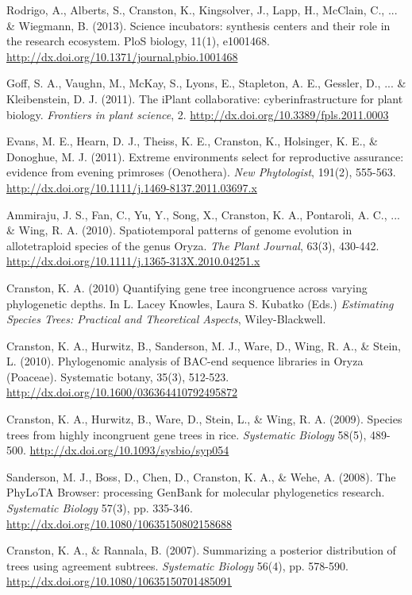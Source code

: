 \documentclass[10pt]{article}
\begin{document}
Rodrigo, A., Alberts, S., Cranston, K., Kingsolver, J., Lapp, H., McClain, C., ... \& Wiegmann, B. (2013). Science incubators: synthesis centers and their role in the research ecosystem. PloS biology, 11(1), e1001468. \url{http://dx.doi.org/10.1371/journal.pbio.1001468} 

Goff, S. A., Vaughn, M., McKay, S., Lyons, E., Stapleton, A. E., Gessler, D., ... \& Kleibenstein, D. J. (2011). The iPlant collaborative: cyberinfrastructure for plant biology. \textit{Frontiers in plant science}, 2. \url{http://dx.doi.org/10.3389/fpls.2011.0003} 

Evans, M. E., Hearn, D. J., Theiss, K. E., Cranston, K., Holsinger, K. E., \& Donoghue, M. J. (2011). Extreme environments select for reproductive assurance: evidence from evening primroses (Oenothera). \textit{New Phytologist}, 191(2), 555-563. \url{http://dx.doi.org/10.1111/j.1469-8137.2011.03697.x} 

Ammiraju, J. S., Fan, C., Yu, Y., Song, X., Cranston, K. A., Pontaroli, A. C., ... \& Wing, R. A. (2010). Spatiotemporal patterns of genome evolution in allotetraploid species of the genus Oryza. \textit{The Plant Journal}, 63(3), 430-442. \url{http://dx.doi.org/10.1111/j.1365-313X.2010.04251.x} 

Cranston, K. A. (2010) Quantifying gene tree incongruence across varying phylogenetic depths. In L. Lacey Knowles, Laura S. Kubatko (Eds.) \textit{Estimating Species Trees: Practical and Theoretical Aspects}, Wiley-Blackwell.

Cranston, K. A., Hurwitz, B., Sanderson, M. J., Ware, D., Wing, R. A., \& Stein, L. (2010). Phylogenomic analysis of BAC-end sequence libraries in Oryza (Poaceae). Systematic botany, 35(3), 512-523. \url{http://dx.doi.org/10.1600/036364410792495872} 

Cranston, K. A., Hurwitz, B., Ware, D., Stein, L., \& Wing, R. A. (2009). Species trees from highly incongruent gene trees in rice.  \textit{Systematic Biology} 58(5), 489-500. \url{http://dx.doi.org/10.1093/sysbio/syp054} 

Sanderson, M. J., Boss, D., Chen, D., Cranston, K. A., \& Wehe, A. (2008). The PhyLoTA Browser: processing GenBank for molecular phylogenetics research. \textit{Systematic Biology} 57(3), pp. 335-346. \url{http://dx.doi.org/10.1080/10635150802158688} 

Cranston, K. A., \& Rannala, B. (2007). Summarizing a posterior distribution of trees using agreement subtrees. \textit{Systematic Biology} 56(4), pp. 578-590. \\
\url{http://dx.doi.org/10.1080/10635150701485091} 
\end{document}
